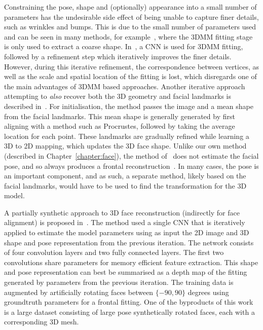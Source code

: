 Constraining the pose, shape and (optionally) appearance into a small
number of parameters has the undesirable side effect of being unable
to capture finer details, such as wrinkles and bumps. This is due to
the small number of parameters used and can be seen in many methods,
for example~\cite{richardson2016learning}, where the 3DMM fitting
stage is only used to extract a coarse
shape. In~\cite{sela2017unrestricted}, a CNN is used for 3DMM fitting,
followed by a refinement step which iteratively improves the finer
details. However, during this iterative refinement, the correspondence
between vertices, as well as the scale and spatial location of the
fitting is lost, which disregards one of the main advantages of 3DMM
based approaches. Another iterative approach attempting to
\textit{also} recover both the 3D geometry and facial landmarks is
described in~\cite{liu2016joint}. For initialisation, the method
passes the image and a mean shape from the facial landmarks. This mean
shape is generally generated by first aligning with a method such as
Procrustes, followed by taking the average location for each
point. These landmarks are gradually refined while learning a 3D to 2D
mapping, which updates the 3D face shape. Unlike our own method
(described in Chapter~\ref{chapter:face}), the method
of~\citeauthor{liu2016joint} does not estimate the facial pose, and so
always produces a frontal reconstruction~\cite{liu2016joint}. In many
cases, the pose is an important component, and as such, a separate
method, likely based on the facial landmarks, would have to be used to
find the transformation for the 3D model.

A partially synthetic approach to 3D face reconstruction (indirectly
for face alignment) is proposed in~\cite{zhu2016face}. The method used
a single CNN that is iteratively applied to estimate the model
parameters using as input the 2D image and 3D shape and pose
representation from the previous iteration. The network consists of
four convolution layers and two fully connected layers. The first two
convolutions share parameters for memory efficient feature
extraction. This shape and pose representation can best be summarised
as a depth map of the fitting generated by parameters from the
previous iteration. The training data is augmented by artificially
rotating faces between $\{-90, 90\}$ degrees using groundtruth
parameters for a frontal fitting. One of the byproducts of this work
is a large dataset consisting of large pose synthetically rotated
faces, each with a corresponding 3D mesh.

